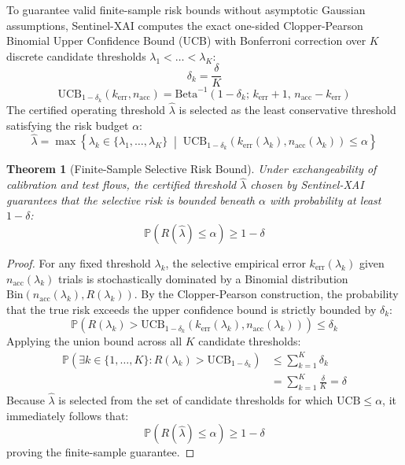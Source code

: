 \documentclass{ieeeaccess}
\newtheorem{theorem}{Theorem}
\begin{document}
To guarantee valid finite-sample risk bounds without asymptotic Gaussian assumptions, Sentinel-XAI computes the exact one-sided Clopper-Pearson Binomial Upper Confidence Bound (UCB) with Bonferroni correction over $K$ discrete candidate thresholds $\lambda_1 < \dots < \lambda_K$:
\begin{equation}
\delta_k = \frac{\delta}{K}
\end{equation}
\begin{equation}
\text{UCB}_{1-\delta_k}(k_{\text{err}}, n_{\text{acc}}) = \text{Beta}^{-1}\left( 1 - \delta_k;\, k_{\text{err}} + 1,\, n_{\text{acc}} - k_{\text{err}} \right)
\end{equation}
The certified operating threshold $\hat{\lambda}$ is selected as the least conservative threshold satisfying the risk budget $\alpha$:
\begin{equation}
\hat{\lambda} = \max \left\{ \lambda_k \in \{\lambda_1, \dots, \lambda_K\} \;\middle|\; \text{UCB}_{1-\delta_k}(k_{\text{err}}(\lambda_k), n_{\text{acc}}(\lambda_k)) \le \alpha \right\}
\end{equation}

\begin{theorem}[Finite-Sample Selective Risk Bound]
\label{thm:conformal_guarantee}
Under exchangeability of calibration and test flows, the certified threshold $\hat{\lambda}$ chosen by Sentinel-XAI guarantees that the selective risk is bounded beneath $\alpha$ with probability at least $1 - \delta$:
\begin{equation}
\mathbb{P}\left( R(\hat{\lambda}) \le \alpha \right) \ge 1 - \delta
\end{equation}
\end{theorem}

\begin{proof}
For any fixed threshold $\lambda_k$, the selective empirical error $k_{\text{err}}(\lambda_k)$ given $n_{\text{acc}}(\lambda_k)$ trials is stochastically dominated by a Binomial distribution $\text{Bin}(n_{\text{acc}}(\lambda_k), R(\lambda_k))$. By the Clopper-Pearson construction, the probability that the true risk exceeds the upper confidence bound is strictly bounded by $\delta_k$:
\begin{equation}
\mathbb{P}\left( R(\lambda_k) > \text{UCB}_{1-\delta_k}(k_{\text{err}}(\lambda_k), n_{\text{acc}}(\lambda_k)) \right) \le \delta_k
\end{equation}
Applying the union bound across all $K$ candidate thresholds:
\begin{align}
\mathbb{P}\left( \exists k \in \{1, \dots, K\} : R(\lambda_k) > \text{UCB}_{1-\delta_k} \right) &\le \sum_{k=1}^K \delta_k \\
&= \sum_{k=1}^K \frac{\delta}{K} = \delta
\end{align}
Because $\hat{\lambda}$ is selected from the set of candidate thresholds for which $\text{UCB} \le \alpha$, it immediately follows that:
\begin{equation}
\mathbb{P}(R(\hat{\lambda}) \le \alpha) \ge 1 - \delta
\end{equation}
proving the finite-sample guarantee.
\end{proof}
\end{document}
